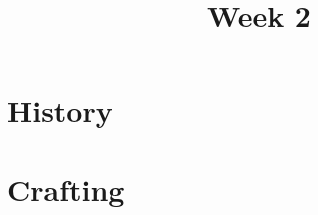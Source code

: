 \documentclass[11pt]{article}
\title{Week 2}
\date{}
\begin{document}
    \maketitle

    \section*{History}
        \begin{itemize}
        \end{itemize}

    \section*{Crafting}
        \begin{itemize}
        \end{itemize}
\end{document}
